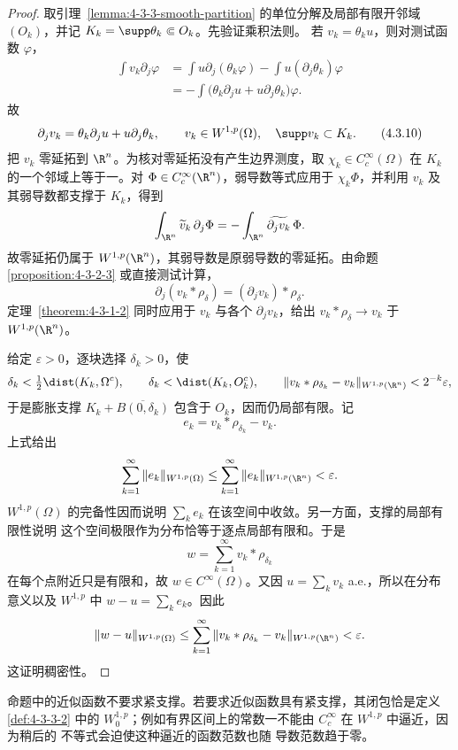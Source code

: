 \begin{proof}
取引理~\ref{lemma:4-3-3-smooth-partition} 的单位分解及局部有限开邻域 $(O_k)$，并记
$K_k=\supp\theta_k\Subset O_k$。先验证乘积法则。
若 $v_k=\theta_ku$，则对测试函数 $\varphi$，
\begin{align*}
 \int v_k\partial_j\varphi
 &=\int u\partial_j(\theta_k\varphi)-\int u(\partial_j\theta_k)\varphi\\
 &=-\int\bigl(\theta_k\partial_ju+u\partial_j\theta_k\bigr)\varphi.
\end{align*}
故
\[
 \partial_jv_k=\theta_k\partial_ju+u\partial_j\theta_k,\qquad
 v_k\in W^{1,p}(\Omega),\quad \supp v_k\subset K_k.
 \tag{4.3.10}\label{eq:4-3-sobolev-product}
\]
把 $v_k$ 零延拓到 $\R^n$。为核对零延拓没有产生边界测度，取
$\chi_k\in C_c^\infty(\Omega)$ 在 $K_k$ 的一个邻域上等于一。对
$\Phi\in C_c^\infty(\R^n)$，弱导数等式应用于 $\chi_k\Phi$，并利用
$v_k$ 及其弱导数都支撑于 $K_k$，得到
\[
 \int_{\R^n}\widetilde v_k\,\partial_j\Phi
 =-\int_{\R^n}\widetilde{\partial_jv_k}\,\Phi.
\]
故零延拓仍属于 $W^{1,p}(\R^n)$，其弱导数是原弱导数的零延拓。由命题
\ref{proposition:4-3-2-3} 或直接测试计算，
\[
 \partial_j(v_k*\rho_\delta)=(\partial_jv_k)*\rho_\delta.
\]
定理~\ref{theorem:4-3-1-2} 同时应用于 $v_k$ 与各个 $\partial_jv_k$，给出
$v_k*\rho_\delta\to v_k$ 于 $W^{1,p}(\R^n)$。

给定 $\varepsilon>0$，逐块选择 $\delta_k>0$，使
\[
 \delta_k<\tfrac12\dist(K_k,\Omega^c),\qquad
 \delta_k<\dist(K_k,O_k^c),\qquad
 \|v_k*\rho_{\delta_k}-v_k\|_{W^{1,p}(\R^n)}
 <2^{-k}\varepsilon,
\]
于是膨胀支撑 $K_k+\overline{B(0,\delta_k)}$ 包含于 $O_k$，因而仍局部有限。记
\[
 e_k=v_k*\rho_{\delta_k}-v_k.
\]
上式给出
\[
 \sum_{k=1}^\infty\|e_k\|_{W^{1,p}(\Omega)}
 \leq\sum_{k=1}^\infty\|e_k\|_{W^{1,p}(\R^n)}
 <\varepsilon.
\]
$W^{1,p}(\Omega)$ 的完备性因而说明 $\sum_ke_k$ 在该空间中收敛。另一方面，支撑的局部有限性说明
这个空间极限作为分布恰等于逐点局部有限和。于是
\[
 w=\sum_{k=1}^\infty v_k*\rho_{\delta_k}
\]
在每个点附近只是有限和，故 $w\in C^\infty(\Omega)$。又因
$u=\sum_kv_k$ a.e.，所以在分布意义以及 $W^{1,p}$ 中
$w-u=\sum_ke_k$。因此
\[
 \|w-u\|_{W^{1,p}(\Omega)}
 \leq\sum_{k=1}^\infty
 \|v_k*\rho_{\delta_k}-v_k\|_{W^{1,p}(\R^n)}<\varepsilon.
\]
这证明稠密性。
\end{proof}

命题中的近似函数不要求紧支撑。若要求近似函数具有紧支撑，其闭包恰是定义
\ref{def:4-3-3-2} 中的 $W_0^{1,p}$；例如有界区间上的常数一不能由
$C_c^\infty$ 在 $W^{1,p}$ 中逼近，因为稍后的 \Poincare{} 不等式会迫使这种逼近的函数范数也随
导数范数趋于零。

